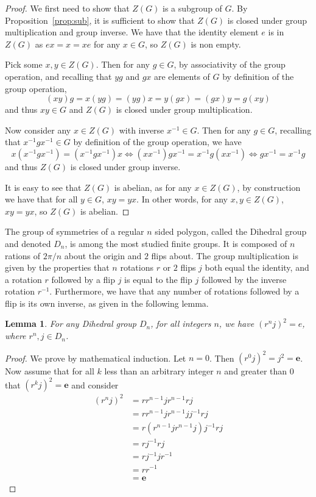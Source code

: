 \documentclass[12pt]{amsart}
\newtheorem{lemma}[theorem]{Lemma}
\theoremstyle{definition}
\theoremstyle{plain}
\def\id{{\mathbf e}}
\begin{document}
\begin{proof}
    We first need to show that $Z(G)$ is a subgroup of $G$. By Proposition~\ref{prop:sub}, it is sufficient to show that $Z(G)$ is closed under group multiplication and group inverse. We have that the identity element $e$ is in $Z(G)$ as $ex = x = xe$ for any $x \in G$, so $Z(G)$ is non empty. 
    
    Pick some $x,y \in Z(G)$. Then for any $g \in G$, by associativity of the group operation, and recalling that $yg$ and $gx$ are elements of $G$ by definition of the group operation,
    \[
        (xy)g = x(yg) = (yg)x = y(gx) = (gx)y = g(xy)
    \]
    and thus $xy \in G$ and $Z(G)$ is closed under group multiplication. 
    
    Now consider any $x \in Z(G)$ with inverse $x^{-1} \in G$. Then for any $g \in G$, recalling that  $x^{-1}gx^{-1} \in G$ by definition of the group operation,  we have
    \[
    x(x^{-1}gx^{-1}) = (x^{-1}gx^{-1})x \iff (xx^{-1})gx^{-1} = x^{-1}g(xx^{-1}) \iff gx^{-1} = x^{-1}g
    \]
    and thus $Z(G)$ is closed under group inverse.

    It is easy to see that $Z(G)$ is abelian, as for any $x \in Z(G)$, by construction we have that for all $y \in G$, $xy = yx$. In other words, for any $x,y \in Z(G)$, $xy = yx$, so $Z(G)$ is abelian. 
\end{proof}

The group of symmetries of a regular $n$ sided polygon, called the Dihedral group and denoted $D_n$, is among the most studied finite groups. It is composed of $n$ rations of $2\pi/n$ about the origin and $2$ flips about. The group multiplication is given by the properties that $n$ rotations $r$ or $2$ flips $j$ both equal the identity, and a rotation $r$ followed by a flip $j$ is equal to the flip $j$ followed by the inverse rotation $r^{-1}$. Furthermore, we have that any number of rotations followed by a flip is its own inverse, as given in the following lemma.

\begin{lemma}\label{lem}
For any Dihedral group $D_n$, for all integers $n$, we have $(r^nj)^2=e$, where $r^n, j \in D_n$.
\end{lemma}
\begin{proof}
We prove by mathematical induction. Let $n=0$. Then $(r^0j)^2=j^2=\id$. Now assume that for all $k$ less than an arbitrary integer $n$ and greater than $0$ that $(r^kj)^2=\id$ and consider
\begin{align*}
    (r^nj)^2 &= r r^{n-1}j r^{n-1} rj \\
    &= r r^{n-1} j r^{n-1} jj^{-1} rj \\
    &= r (r^{n-1} j r^{n-1}j)j^{-1} rj \\
    &= rj^{-1} rj  \\
    &= rj^{-1}jr^{-1} \\
    &= rr^{-1} \\
    &=\id
\end{align*}
\end{proof}
\end{document}
